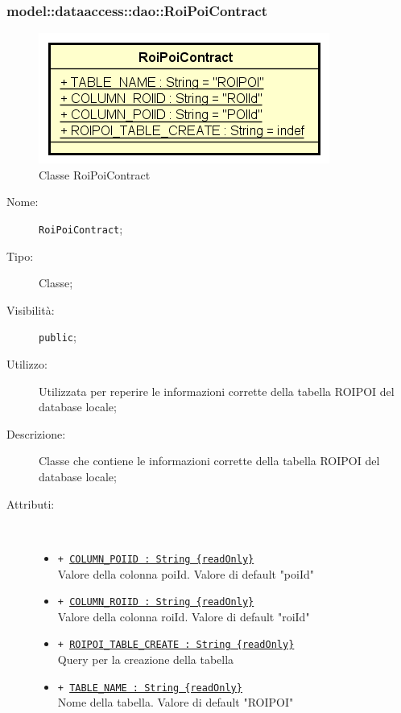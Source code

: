 \documentclass[../DefinizioneDiProdotto.tex]{subfiles}
\begin{document}
\subsubsection{model::dataaccess::dao::RoiPoiContract}

    \begin{figure}[H]
        \centering
        \includegraphics{img/RoiPoiContract.png}
        \caption{Classe RoiPoiContract}\label{fig:model::dataaccess::dao::RoiPoiContract} 
    \end{figure}
    \begin{description}
\item[Nome:] \texttt{RoiPoiContract};
\item[Tipo:] Classe;
\item[Visibilità:] \texttt{public};
\item[Utilizzo:] Utilizzata per reperire le informazioni corrette della tabella ROIPOI del database locale;
\item[Descrizione:] Classe che contiene le informazioni corrette della tabella ROIPOI del database locale;
\item[Attributi:] \
\begin{itemize}
\item \texttt{+ \underline{COLUMN\_POIID : String \{readOnly\}}}\\
Valore della colonna poiId. Valore di default "poiId"

\item \texttt{+ \underline{COLUMN\_ROIID : String \{readOnly\}}}\\
Valore della colonna roiId. Valore di default "roiId"

\item \texttt{+ \underline{ROIPOI\_TABLE\_CREATE : String \{readOnly\}}}\\
Query per la creazione della tabella

\item \texttt{+ \underline{TABLE\_NAME : String \{readOnly\}}}\\
Nome della tabella. Valore di default "ROIPOI"

\end{itemize}
\end{description}
\end{document}
